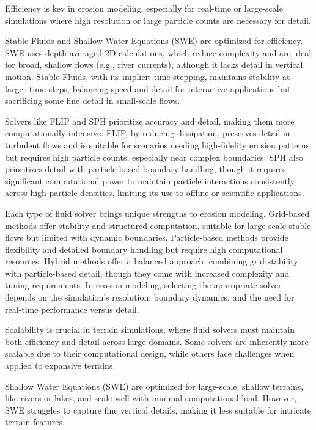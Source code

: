 Efficiency is key in erosion modeling, especially for real-time or large-scale simulations where high resolution or large particle counts are necessary for detail.

Stable Fluids and Shallow Water Equations (SWE) are optimized for efficiency. SWE uses depth-averaged 2D calculations, which reduce complexity and are ideal for broad, shallow flows (e.g., river currents), although it lacks detail in vertical motion. Stable Fluids, with its implicit time-stepping, maintains stability at larger time steps, balancing speed and detail for interactive applications but sacrificing some fine detail in small-scale flows.

Solvers like FLIP and SPH prioritize accuracy and detail, making them more computationally intensive. FLIP, by reducing dissipation, preserves detail in turbulent flows and is suitable for scenarios needing high-fidelity erosion patterns but requires high particle counts, especially near complex boundaries. SPH also prioritizes detail with particle-based boundary handling, though it requires significant computational power to maintain particle interactions consistently across high particle densities, limiting its use to offline or scientific applications.

\smallConclusion

Each type of fluid solver brings unique strengths to erosion modeling. Grid-based methods offer stability and structured computation, suitable for large-scale stable flows but limited with dynamic boundaries. Particle-based methods provide flexibility and detailed boundary handling but require high computational resources. Hybrid methods offer a balanced approach, combining grid stability with particle-based detail, though they come with increased complexity and tuning requirements. In erosion modeling, selecting the appropriate solver depends on the simulation's resolution, boundary dynamics, and the need for real-time performance versus detail.



Scalability is crucial in terrain simulations, where fluid solvers must maintain both efficiency and detail across large domains. Some solvers are inherently more scalable due to their computational design, while others face challenges when applied to expansive terrains.

Shallow Water Equations (SWE) are optimized for large-scale, shallow terrains, like rivers or lakes, and scale well with minimal computational load. However, SWE struggles to capture fine vertical details, making it less suitable for intricate terrain features.

